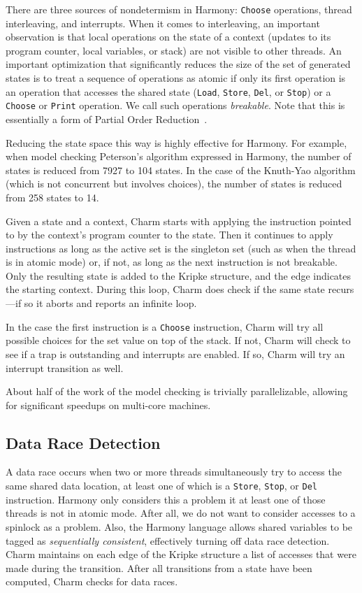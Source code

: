 \documentclass[twocolumn]{article}
\begin{document}
There are three sources of nondetermism in Harmony: \texttt{Choose}
operations, thread interleaving, and interrupts.
When it comes to interleaving, an important observation is that
local operations on the state of a context (updates to its program
counter, local variables, or stack) are not visible to other threads.
An important optimization that significantly
reduces the size of the set of generated states is to treat a
sequence of operations as atomic if only its first operation is an
operation that accesses the shared state (\texttt{Load}, \texttt{Store},
\texttt{Del}, or \texttt{Stop}) or a \texttt{Choose} or \texttt{Print}
operation.  We call such operations \emph{breakable}.
Note that this is essentially a form of Partial Order Reduction~\cite{Val91}.

Reducing the state space this way is highly effective for Harmony.
For example, when model checking Peterson's algorithm expressed in
Harmony, the number of states is reduced from 7927 to 104 states.
In the case of the Knuth-Yao algorithm (which is not concurrent but
involves choices), the number of states is reduced from 258 states
to 14.

Given a state and a context, Charm starts with applying the instruction
pointed to by the context's program counter to the state.
Then it continues to apply instructions as long as
the active set is the singleton set (such as when the thread is in
atomic mode) or, if not, as long as the next instruction is not
breakable.  Only the resulting state is added to the Kripke structure,
and the edge indicates the starting context.  During this loop, Charm
does check if the same state recurs---if so it aborts
and reports an infinite loop.

In the case the first instruction is a \texttt{Choose} instruction,
Charm will try all possible choices for the set value
on top of the stack.  If not, Charm will check to
see if a trap is outstanding and interrupts are enabled.  If so,
Charm will try an interrupt transition as well.

About half of the work of the model checking is trivially parallelizable,
allowing for significant speedups on multi-core machines.

\subsection{Data Race Detection}

A data race occurs when two or more threads simultaneously try to
access the same shared data location, at least one of which is a
\texttt{Store}, \texttt{Stop}, or \texttt{Del} instruction.  Harmony
only considers this a problem it at least one of those threads is
not in atomic mode.  After all, we do not want to consider accesses
to a spinlock as a problem.  Also, the Harmony language allows
shared variables to be tagged as \emph{sequentially consistent},
effectively turning off data race detection.  Charm maintains on
each edge of the Kripke structure a list of accesses that were made
during the transition.  After all transitions from a state have been
computed, Charm checks for data races.
\end{document}
